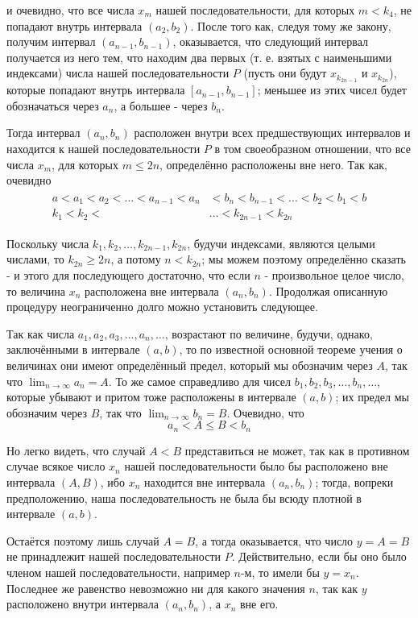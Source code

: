 \documentclass[12pt]{article}
\begin{document}
\begin{enumerate}
и очевидно, что все числа $x_m$ нашей последовательности, для которых $m < k_4$, не попадают внутрь интервала $(a_2, b_2)$. После того как, следуя тому же закону, получим интервал $(a_{n - 1}, b_{n - 1})$, оказывается, что следующий интервал получается из него тем, что находим два первых (т. е. взятых с наименьшими индексами) числа нашей последовательности $P$ (пусть они будут $x_{k_{2n - 1}}$ и $x_{k_{2n}}$), которые попадают внутрь интервала $[a_{n - 1}, b_{n - 1}]$; меньшее из этих чисел будет обозначаться через $a_n$, а большее - через $b_n$.

Тогда интервал $(a_n, b_n)$ расположен внутри всех предшествующих интервалов и находится к нашей последовательности $P$ в том своеобразном отношении, что все числа $x_m$, для которых $m \leq 2n$, определённо расположены вне него. Так как, очевидно
\begin{align}
\begin{split}
a < a_1 < a_2 < \dots < a_{n - 1} < a_n &< b_n < b_{n - 1} < \dots < b_2 < b_1 < b\\
k_1 < k_2 < &\dots < k_{2n - 1} < k_{2n}
\end{split}
\end{align}

Поскольку числа $k_1, k_2, \dots, k_{2n - 1}, k_{2n}$, будучи индексами, являются целыми числами, то $k_{2n} \geq 2n$, а потому $n < k_{2n}$; мы можем поэтому определённо сказать - и этого для последующего достаточно, что если $n$ - произвольное целое число, то величина $x_n$ расположена вне интервала $(a_n, b_n)$. Продолжая описанную процедуру неограниченно долго можно установить следующее.

Так как числа $a_1, a_2, a_3, \dots, a_n, \dots$, возрастают по величине, будучи, однако, заключёнными в интервале $(a, b)$, то по известной основной теореме учения о величинах они имеют определённый предел, который мы обозначим через $A$, так что $\lim_{n\to\infty} a_n = A$. То же самое справедливо для чисел $b_1, b_2, b_3, \dots, b_n, \dots$, которые убывают и притом тоже расположены в интервале $(a, b)$; их предел мы обозначим через $B$, так что $\lim_{n\to\infty} b_n = B$. Очевидно, что 
\begin{equation}
a_n < A \leq B < b_n
\end{equation}

Но легко видеть, что случай $A < B$ представиться не может, так как в противном случае всякое число $x_n$ нашей последовательности было бы расположено вне интервала $(A, B)$, ибо $x_n$ находится вне интервала $(a_n, b_n)$; тогда, вопреки предположению, наша последовательность не была бы всюду плотной в интервале $(a, b)$.

Остаётся поэтому лишь случай $A = B$, а тогда оказывается, что число $y = A = B$ не принадлежит нашей последовательности $P$. Действительно, если бы оно было членом нашей последовательности, например $n$-м, то имели бы $y = x_n$. Последнее же равенство невозможно ни для какого значения $n$, так как $y$ расположено внутри интервала $(a_n, b_n)$, а $x_n$ вне его.

\end{enumerate}
\end{document}
